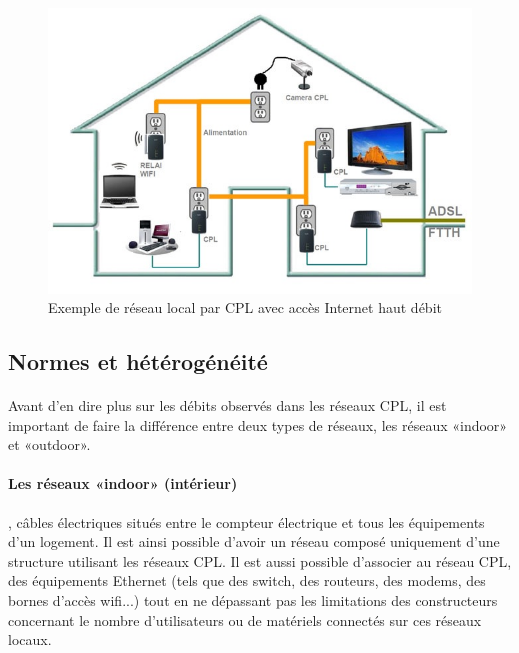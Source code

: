     \begin{figure}[h]
        \begin{center}
            \includegraphics[scale=0.5]{./images/cpl/exempleReseauLocalCPL.jpg}
        \end{center}
            \caption{ Exemple de réseau local par CPL avec accès Internet haut débit } %
            \label{Exemple liens actuels avec CPL}
    \end{figure}

        \subsection{Normes et hétérogénéité}
            \paragraph{}
Avant d’en dire plus sur les débits observés dans les réseaux CPL, il est important de faire la différence entre deux types de réseaux,
les réseaux «indoor» et «outdoor».
            \paragraph{Les réseaux «indoor» (intérieur)}
, câbles électriques situés entre le compteur électrique et tous les équipements d’un logement.
Il est ainsi possible d'avoir un réseau composé uniquement d'une structure utilisant les réseaux CPL.
Il est aussi possible d'associer au réseau CPL, des équipements Ethernet (tels que des switch, des routeurs, des modems, des bornes d'accès wifi...)
tout en ne dépassant pas les limitations des constructeurs concernant le nombre d'utilisateurs ou de matériels connectés sur ces réseaux locaux.
